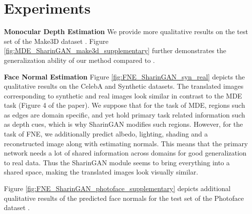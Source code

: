 \documentclass[10pt,twocolumn,letterpaper]{article}
\begin{document}
\section{Experiments}
\textbf{Monocular Depth Estimation} We provide more qualitative results on the test set of the Make3D dataset \cite{make3D}. Figure \ref{fig:MDE_SharinGAN_make3d_supplementary} further demonstrates the generalization ability of our method compared to \cite{GASDA}.

\textbf{Face Normal Estimation} Figure \ref{fig:FNE_SharinGAN_syn_real} depicts the qualitative results on the CelebA \cite{celebA} and Synthetic \cite{SfSNet} datasets. The translated images corresponding to synthetic and real images look similar in contrast to the MDE task (Figure 4 of the paper). We suppose that for the task of MDE, regions such as edges are domain specific, and yet hold primary task related information such as depth cues, which is why SharinGAN modifies such regions. However, for the task of FNE, we additionally predict albedo, lighting, shading and a reconstructed image along with estimating normals. This means that the primary network needs a lot of shared information across domains for good generalization to real data. Thus the SharinGAN module seems to bring everything into a shared space, making the translated images  look visually similar.

Figure \ref{fig:FNE_SharinGAN_photoface_supplementary} depicts additional qualitative results of the predicted face normals for the test set of the Photoface dataset \cite{Photoface}. 
\end{document}

